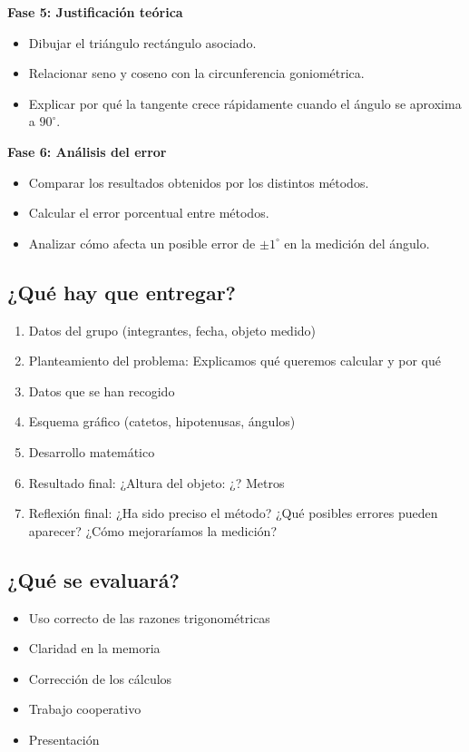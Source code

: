 \documentclass[a4paper,12pt]{extarticle}
\begin{document}
        \textbf{Fase 5: Justificación teórica}
            \begin{itemize}
                \item Dibujar el triángulo rectángulo asociado.
                \item Relacionar seno y coseno con la circunferencia goniométrica.
                \item Explicar por qué la tangente crece rápidamente cuando el ángulo se aproxima a $90^\circ$.
            \end{itemize}

        \textbf{Fase 6: Análisis del error}
            \begin{itemize}
                \item Comparar los resultados obtenidos por los distintos métodos.
                \item Calcular el error porcentual entre métodos.
                \item Analizar cómo afecta un posible error de $\pm 1^\circ$ en la medición del ángulo.
            \end{itemize}

        




    \subsection*{¿Qué hay que entregar?}

    \begin{enumerate}
        \item Datos del grupo (integrantes, fecha, objeto medido)
        \item Planteamiento del problema: Explicamos qué queremos calcular y por qué
        \item Datos que se han recogido
        \item Esquema gráfico (catetos, hipotenusas, ángulos)
        \item Desarrollo matemático
        \item Resultado final: ¿Altura del objeto:  ¿? Metros
        \item Reflexión final: ¿Ha sido preciso el método? ¿Qué posibles errores pueden aparecer? ¿Cómo mejoraríamos la medición?
    \end{enumerate}

    \subsection*{¿Qué se evaluará?}
    \begin{itemize}
        \item Uso correcto de las razones trigonométricas
        \item Claridad en la memoria
        \item Corrección de los cálculos
        \item Trabajo cooperativo 
        \item Presentación
    \end{itemize}
\end{document}
